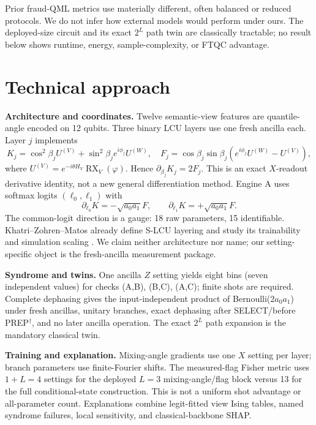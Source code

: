 \documentclass[10pt,a4paper]{article}
\begin{document}
Prior fraud-QML metrics use materially different, often balanced or reduced
protocols. We do not infer how external models would perform under ours. The
deployed-size circuit and its exact $2^L$ path twin are classically tractable;
no result below shows runtime, energy, sample-complexity, or FTQC advantage.

\section{Technical approach}

\textbf{Architecture and coordinates.} Twelve semantic-view features are
quantile-angle encoded on 12 qubits. Three binary LCU layers use one fresh
ancilla each. Layer $j$ implements
\begin{equation}
K_j=\cos^2\!\beta_j U^{(V)}+\sin^2\!\beta_j e^{i\phi_j}U^{(W)},\quad
F_j=\cos\beta_j\sin\beta_j\!\left(e^{i\phi_j}U^{(W)}-U^{(V)}\right),
\end{equation}
where $U^{(V)}=e^{-i\theta H_V}\operatorname{RX}_V(\varphi)$. Hence
$\partial_{\beta_j}K_j=2F_j$. This is an exact $X$-readout derivative
identity, not a new general differentiation method. Engine A uses softmax
logits $(\ell_0,\ell_1)$ with
\begin{equation}
\partial_{\ell_0}K=-\sqrt{a_0a_1}F,\qquad
\partial_{\ell_1}K=+\sqrt{a_0a_1}F.
\end{equation}
The common-logit direction is a gauge: 18 raw parameters, 15 identifiable.
Khatri--Zohren--Matos already define S-LCU layering and study its trainability
and simulation scaling \cite{Khatri}. We claim neither architecture nor name;
our setting-specific object is the fresh-ancilla measurement package.

\textbf{Syndrome and twins.} One ancilla $Z$ setting yields eight bins (seven
independent values) for checks (A,B), (B,C), (A,C); finite shots are required.
Complete dephasing gives the input-independent product of
Bernoulli($2a_0a_1$) under fresh ancillas, unitary branches, exact dephasing
after SELECT/before PREP$^\dagger$, and no later ancilla operation. The exact
$2^L$ path expansion is the mandatory classical twin.

\textbf{Training and explanation.} Mixing-angle gradients use one $X$ setting
per layer; branch parameters use finite-Fourier shifts. The measured-flag
Fisher metric uses $1+L=4$ settings for the deployed $L=3$ mixing-angle/flag
block versus 13 for the full conditional-state construction. This is not a
uniform shot advantage or all-parameter count. Explanations combine
legit-fitted view Ising tables, named syndrome failures, local sensitivity,
and classical-backbone SHAP.
\end{document}
